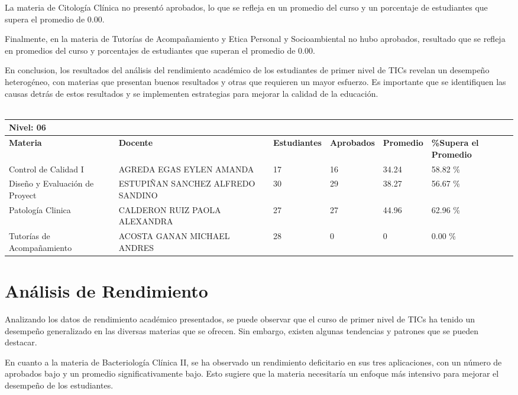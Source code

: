 La materia de Citología Clínica no presentó aprobados, lo que se refleja en un promedio del curso y un porcentaje de estudiantes que supera el promedio de 0.00.

Finalmente, en la materia de Tutorías de Acompañamiento y Etica Personal y Socioambiental no hubo aprobados, resultado que se refleja en promedios del curso y porcentajes de estudiantes que superan el promedio de 0.00.

En conclusion, los resultados del análisis del rendimiento académico de los estudiantes de primer nivel de TICs revelan un desempeño heterogéneo, con materias que presentan buenos resultados y otras que requieren un mayor esfuerzo. Es importante que se identifiquen las causas detrás de estos resultados y se implementen estrategias para mejorar la calidad de la educación.\\
\vspace{1cm}\\\small
\begin{tabularx}{\textwidth}{|p{2.5cm}|p{2.5cm}|X|X|X|X|}
\hline
\multicolumn{6}{|X|}{\textbf{Nivel: 06 }}\\\hline\textbf{Materia} & \textbf{Docente} & \textbf{Estudiantes} & \textbf{Aprobados} & \textbf{Promedio} & \textbf{\%Supera el Promedio} \\ \hline
Control de Calidad I & AGREDA EGAS EYLEN AMANDA & 17 & 16 & 34.24 & 58.82 \%\\ \hline
Diseño y Evaluación de Proyect & ESTUPIÑAN SANCHEZ ALFREDO SANDINO & 30 & 29 & 38.27 & 56.67 \%\\ \hline
Patología Clinica & CALDERON RUIZ PAOLA ALEXANDRA & 27 & 27 & 44.96 & 62.96 \%\\ \hline
Tutorías de Acompañamiento & ACOSTA GANAN MICHAEL ANDRES & 28 & 0 & 0 & 0.00 \%\\ \hline
\end{tabularx}

\vspace{1cm}
\section{Análisis de Rendimiento}
Analizando los datos de rendimiento académico presentados, se puede observar que el curso de primer nivel de TICs ha tenido un desempeño generalizado en las diversas materias que se ofrecen. Sin embargo, existen algunas tendencias y patrones que se pueden destacar.

En cuanto a la materia de Bacteriología Clínica II, se ha observado un rendimiento deficitario en sus tres aplicaciones, con un número de aprobados bajo y un promedio significativamente bajo. Esto sugiere que la materia necesitaría un enfoque más intensivo para mejorar el desempeño de los estudiantes.

